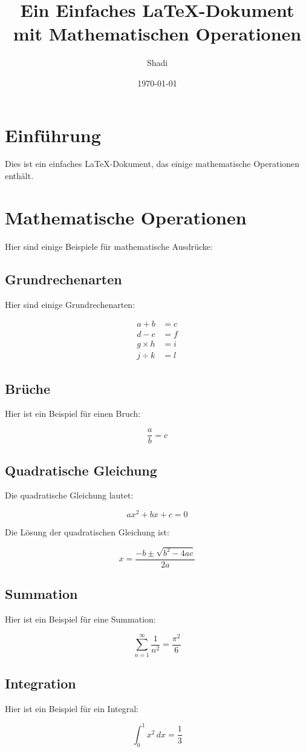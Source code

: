 \documentclass{article}
\begin{document}
\title{Ein Einfaches LaTeX-Dokument mit Mathematischen Operationen}
\author{Shadi}
\date{\today}
\maketitle

\section{Einführung}
Dies ist ein einfaches LaTeX-Dokument, das einige mathematische Operationen enthält.

\section{Mathematische Operationen}

Hier sind einige Beispiele für mathematische Ausdrücke:

\subsection{Grundrechenarten}
Hier sind einige Grundrechenarten:

\begin{align*}
a + b &= c \\
d - e &= f \\
g \times h &= i \\
j \div k &= l
\end{align*}

\subsection{Brüche}
Hier ist ein Beispiel für einen Bruch:

\begin{equation}
\frac{a}{b} = c
\end{equation}

\subsection{Quadratische Gleichung}
Die quadratische Gleichung lautet:

\begin{equation}
ax^2 + bx + c = 0
\end{equation}

Die Lösung der quadratischen Gleichung ist:

\begin{equation}
x = \frac{-b \pm \sqrt{b^2 - 4ac}}{2a}
\end{equation}

\subsection{Summation}
Hier ist ein Beispiel für eine Summation:

\begin{equation}
\sum_{n=1}^{\infty} \frac{1}{n^2} = \frac{\pi^2}{6}
\end{equation}

\subsection{Integration}
Hier ist ein Beispiel für ein Integral:

\begin{equation}
\int_{0}^{1} x^2 \, dx = \frac{1}{3}
\end{equation}
\end{document}
